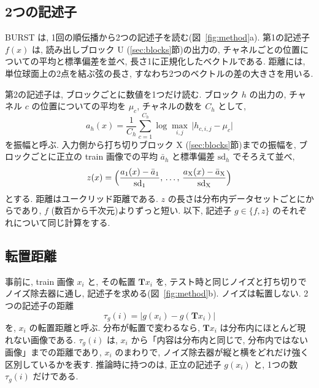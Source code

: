 \documentclass[MIRU,submit]{miru2025j}
\newcommand{\Tm}{\mathbf{T}}            %
\newcommand{\method}{BURST}                 %
\begin{document}
\subsection{2つの記述子}
\label{sec:desc}
\method{} は, 1回の順伝播から2つの記述子を読む(図~\ref{fig:method}a). 第1の記述子 $f(x)$ は, 読み出しブロック U (\ref{sec:blocks}節)の出力の, チャネルごとの位置についての平均と標準偏差を並べ, 長さ1に正規化したベクトルである. 距離には, 単位球面上の2点を結ぶ弦の長さ, すなわち2つのベクトルの差の大きさを用いる.

第2の記述子は, ブロックごとに数値を1つだけ読む. ブロック $h$ の出力の, チャネル $c$ の位置についての平均を $\mu_c$, チャネルの数を $C_h$ として,
\begin{equation}
a_h(x)=\frac{1}{C_h}\sum_{c=1}^{C_h}\log\max_{i,j}\,\bigl|h_{c,i,j}-\mu_c\bigr|
\label{eq:amp}
\end{equation}
を振幅と呼ぶ. 入力側から打ち切りブロック X (\ref{sec:blocks}節)までの振幅を, ブロックごとに正立の train 画像での平均 $\bar{a}_h$ と標準偏差 $\mathrm{sd}_h$ でそろえて並べ,
\begin{equation}
z(x)=\Bigl(\frac{a_1(x)-\bar{a}_1}{\mathrm{sd}_1},\,\ldots,\,\frac{a_{\mathrm{X}}(x)-\bar{a}_{\mathrm{X}}}{\mathrm{sd}_{\mathrm{X}}}\Bigr)
\label{eq:z}
\end{equation}
とする. 距離はユークリッド距離である. $z$ の長さは分布内データセットごとに\nNzMin{}から\nNzMax{}であり, $f$ (数百から千次元)よりずっと短い. 以下, 記述子 $g\in\{f,z\}$ のそれぞれについて同じ計算をする.

\subsection{転置距離}
\label{sec:tau}
事前に, train 画像 $x_i$ と, その転置 $\Tm x_i$ を, テスト時と同じノイズと打ち切りでノイズ除去器に通し, 記述子を求める(図~\ref{fig:method}b). ノイズは転置しない. 2つの記述子の距離
\begin{equation}
\tau_g(i)=\bigl|g(x_i)-g(\Tm x_i)\bigr|
\label{eq:tau}
\end{equation}
を, $x_i$ の転置距離と呼ぶ. 分布が転置で変わるなら, $\Tm x_i$ は分布内にほとんど現れない画像である. $\tau_g(i)$ は, $x_i$ から「内容は分布内と同じで, 分布内ではない画像」までの距離であり, $x_i$ のまわりで, ノイズ除去器が縦と横をどれだけ強く区別しているかを表す. 推論時に持つのは, 正立の記述子 $g(x_i)$ と, 1つの数 $\tau_g(i)$ だけである.
\end{document}
